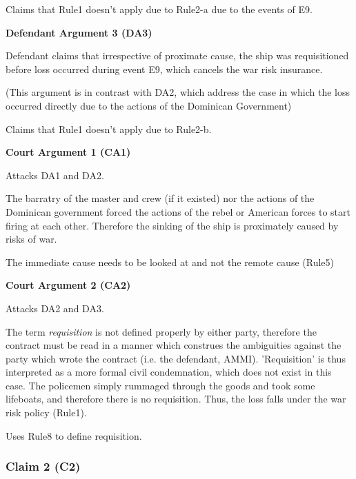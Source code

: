             Claims that Rule1 doesn't apply due to Rule2-a due to the events of E9.
        
        \textbf{Defendant Argument 3 (DA3)}
        
            Defendant claims that irrespective of proximate cause, the ship was requisitioned before loss occurred during event E9, which cancels the war risk insurance.
            
            (This argument is in contrast with DA2, which address the case in which the loss occurred directly due to the actions of the Dominican Government) 
            
            Claims that Rule1 doesn't apply due to Rule2-b.
        
        \textbf{Court Argument 1 (CA1)}
        
            Attacks DA1 and DA2.
            
            The barratry of the master and crew (if it existed) nor the actions of the Dominican government forced the actions of the rebel or American forces to start firing at each other. Therefore the sinking of the ship is proximately caused by risks of war.
            
            The immediate cause needs to be looked at and not the remote cause (Rule5)
        
        \textbf{Court Argument 2 (CA2)}
        
            Attacks DA2 and DA3.
            
            The term \textit{requisition} is not defined properly by either party, therefore the contract must be read in a manner which construes the ambiguities against the party which wrote the contract (i.e. the defendant, AMMI). 'Requisition' is thus interpreted as a more formal civil condemnation, which does not exist in this case. The policemen simply rummaged through the goods and took some lifeboats, and therefore there is no requisition. Thus, the loss falls under the war risk policy (Rule1).
            
            Uses Rule8 to define requisition.
    
    \subsubsection{Claim 2 (C2)}
    
        

